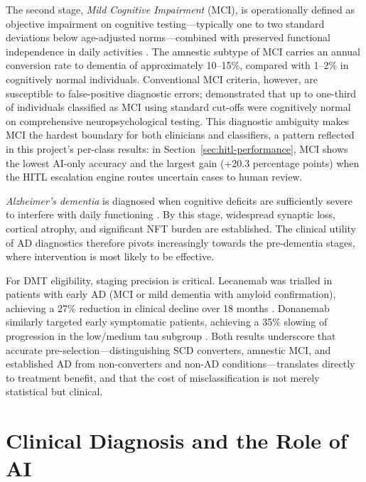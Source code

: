 The second stage, \emph{Mild Cognitive Impairment} (MCI), is operationally
defined as objective impairment on cognitive testing---typically one to two
standard deviations below age-adjusted norms---combined with preserved
functional independence in daily activities \citep{albert2011mci,
petersen2004mci}. The amnestic subtype of MCI carries an annual conversion rate
to dementia of approximately 10--15\%, compared with 1--2\% in cognitively
normal individuals. Conventional MCI criteria, however, are susceptible to
false-positive diagnostic errors; \citet{edmonds2015mci} demonstrated that up
to one-third of individuals classified as MCI using standard cut-offs were
cognitively normal on comprehensive neuropsychological testing. This diagnostic
ambiguity makes MCI the hardest boundary for both clinicians and classifiers,
a pattern reflected in this project's per-class results: in Section~\ref{sec:hitl-performance},
MCI shows the lowest AI-only accuracy and the largest gain (+20.3 percentage
points) when the HITL escalation engine routes uncertain cases to human review.

\emph{Alzheimer's dementia} is diagnosed when cognitive deficits are
sufficiently severe to interfere with daily functioning
\citep{mckhann2011diagnosis}. By this stage, widespread synaptic loss, cortical
atrophy, and significant NFT burden are established. The clinical utility of AD
diagnostics therefore pivots increasingly towards the pre-dementia stages, where
intervention is most likely to be effective.

For DMT eligibility, staging precision is critical. Lecanemab was trialled in
patients with early AD (MCI or mild dementia with amyloid confirmation),
achieving a 27\% reduction in clinical decline over 18 months
\citep{vandyck2023lecanemab}. Donanemab similarly targeted early symptomatic
patients, achieving a 35\% slowing of progression in the low/medium tau
subgroup \citep{sims2023donanemab}. Both results underscore that accurate
pre-selection---distinguishing SCD converters, amnestic MCI, and established
AD from non-converters and non-AD conditions---translates directly to treatment
benefit, and that the cost of misclassification is not merely statistical but
clinical.

\section{Clinical Diagnosis and the Role of AI}
\label{sec:clinical-diagnosis}

